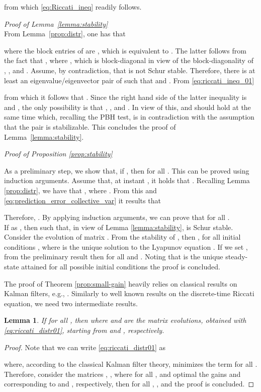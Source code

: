 \documentclass[journal,10pt,draftcls,onecolumn]{IEEEtran}
\newtheorem{lemma}{Lemma}
\newtheorem{proof}{Proof}
\begin{document}
  from which \eqref{eq:Riccati_ineq} readily follows.\hfill{}

\medskip
\emph{Proof of Lemma~\ref{lemma:stability}}\\
From Lemma~\ref{prop:distr}, one has that

where the block entries of  are , which is equivalent to . The latter follows from the fact that , where
,
which is block-diagonal in view of the block-diagonality of , , and .
Assume, by contradiction, that  is not Schur stable. Therefore, there is at least an eigenvalue/eigenvector pair  of  such that  and . From \eqref{eq:riccati_ineq_01}

from which it follows that
.
Since the right hand side of the latter inequality is  and , the only possibility is that , , and . In view of this,  and  should hold at the same time which, recalling the PBH test, is in contradiction with the assumption that the pair  is stabilizable. This concludes the proof of Lemma~\ref{lemma:stability}.\hfill

\medskip
\emph{Proof of Proposition \ref{prop:stability}}

\medskip

As a preliminary step, we show that, if , then   for all . This can be proved using induction arguments. Assume that, at instant , it holds that . Recalling  Lemma \ref{prop:distr}, we have that
,
where .
From this and \eqref{eq:prediction_error_collective_var} it results that

Therefore, . By applying induction arguments, we can prove that  for all .\\
If  as , then  such that, in view of Lemma \ref{lemma:stability},  is Schur stable. Consider the evolution of matrix . From the stability of , then , for all initial conditions , where  is the unique solution to the Lyapunov equation
.
If we set , from the preliminary result then  for all  and . Noting that  is the unique steady-state attained for all possible initial conditions the proof is concluded. \hfill

\medskip
The proof of Theorem \ref{prop:small-gain} heavily relies on classical results on Kalman filters, e.g., \cite{Caines-Mayne-Riccati,AndMooFilt,GoodwinRiccati-84,GoodwinRiccati-86}.
Similarly to well known results on the discrete-time Riccati equation, we need two intermediate results.

\begin{lemma}
\label{lemma:riccati:monoton}
If  for all , then  where  and  are the matrix evolutions, obtained with \eqref{eq:riccati_distr01}, starting from  and , respectively.
\end{lemma}
\begin{proof}
Note that we can write \eqref{eq:riccati_distr01} as

where, according to the classical Kalman filter theory,  minimizes the term  for all . Therefore, consider the matrices , , where  for all , and optimal the gains  and  corresponding to  and , respectively, then for all , ,
and the proof is concluded.\hfill
\end{proof}
\end{document}

